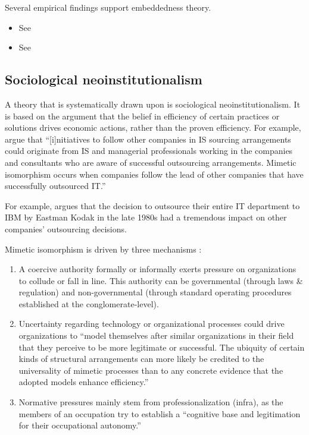 \documentclass[12pt]{article}
\providecommand{\tightlist}{%
  \setlength{\itemsep}{0pt}\setlength{\parskip}{0pt}}
\begin{document}
Several empirical findings support embeddedness theory.

\begin{itemize}
\item
  See \citep[ 16]{armbruster2006}
\item
  See \citep{kitay2004}
\end{itemize}

\hypertarget{sociological-neoinstitutionalism}{%
\subsection{Sociological
neoinstitutionalism}\label{sociological-neoinstitutionalism}}

A theory that is systematically drawn upon \citep[ 6-8]{armbruster2006}
is sociological neoinstitutionalism. It is based on the argument that
the belief in efficiency of certain practices or solutions drives
economic actions, rather than the proven efficiency. For example,
\citet[120]{jayatilaka2006} argue that ``{[}i{]}nitiatives to follow
other companies in IS sourcing arrangements could originate from IS and
managerial professionals working in the companies and consultants who
are aware of successful outsourcing arrangements. Mimetic isomorphism
occurs when companies follow the lead of other companies that have
successfully outsourced IT.''

For example, \citet[350]{loh1992} argues that the decision to outsource
their entire IT department to IBM by Eastman Kodak in the late 1980s had
a tremendous impact on other companies' outsourcing decisions.

Mimetic isomorphism is driven by three mechanisms \citep[
150-154]{dimaggio1983}:

\begin{enumerate}
\def\labelenumi{\arabic{enumi}.}
\tightlist
\item
  A coercive authority formally or informally exerts pressure on
  organizations to collude or fall in line. This authority can be
  governmental (through laws \& regulation) and non-governmental
  (through standard operating procedures established at the
  conglomerate-level).
\item
  Uncertainty regarding technology or organizational processes could
  drive organizations to ``model themselves after similar organizations
  in their field that they perceive to be more legitimate or successful.
  The ubiquity of certain kinds of structural arrangements can more
  likely be credited to the universality of mimetic processes than to
  any concrete evidence that the adopted models enhance efficiency.''
\item
  Normative pressures mainly stem from professionalization (infra), as
  the members of an occupation try to establish a ``cognitive base and
  legitimation for their occupational autonomy.''
\end{enumerate}
\end{document}
